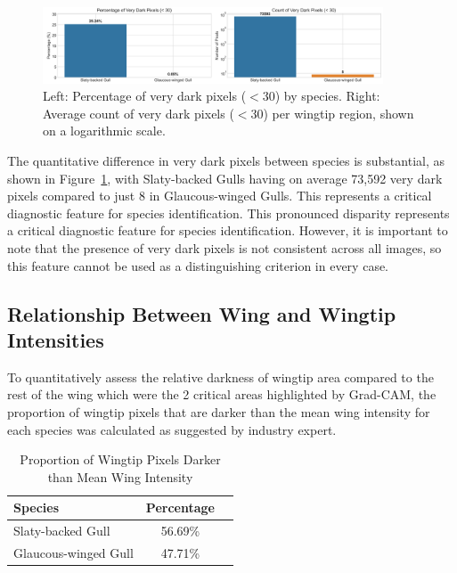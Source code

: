 \documentclass[a4paper,12pt]{report}
\begin{document}
\begin{figure}[H]
    \centering
    \includegraphics[width=0.9\textwidth]{images/REPORT_IMAGES_INTENSITY/I2/darkpixels.png}
    \caption{Left: Percentage of very dark pixels ($<$30) by species. Right: Average count of very dark pixels ($<$30) per wingtip region, shown on a logarithmic scale.}
    \label{fig:darkpixels}
\end{figure}

The quantitative difference in very dark pixels between species is substantial, as shown in Figure~\ref{fig:darkpixels}, with Slaty-backed Gulls having on average 73,592 very dark pixels compared to just 8 in Glaucous-winged Gulls. This represents a critical diagnostic feature for species identification. This pronounced disparity represents a critical diagnostic feature for species identification. However, it is important to note that the presence of very dark pixels is not consistent across all images, so this feature cannot be used as a distinguishing criterion in every case.

\subsection{Relationship Between Wing and Wingtip Intensities}

To quantitatively assess the relative darkness of wingtip area compared to the rest of the wing which were the 2 critical areas highlighted by Grad-CAM, the proportion of wingtip pixels that are darker than the mean wing intensity for each species was calculated as suggested by industry expert.


\begin{table}[H]
    \centering
    \caption{Proportion of Wingtip Pixels Darker than Mean Wing Intensity}
    \label{tab:darknessproportion}
    \begin{tabular}{lcc}
        \toprule
        Species & Percentage \\
        \midrule
        Slaty-backed Gull & 56.69\% \\
        Glaucous-winged Gull & 47.71\% \\
        \bottomrule
    \end{tabular}
\end{table}
\end{document}
